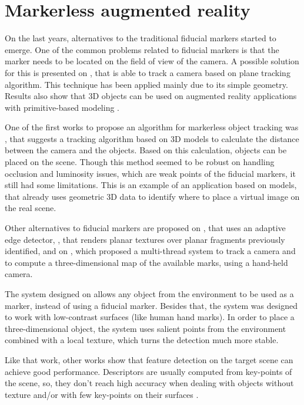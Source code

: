 \documentclass[msc, a4paper, classic, en]{ufbathesis}
\begin{document}
\section{Markerless augmented reality}

On the last years, alternatives to the traditional fiducial markers started to emerge. One of the common problems related to fiducial markers is that the marker needs to be located on the field of view of the camera. A possible solution for this is presented on \cite{5739718}, that is able to track a camera based on plane tracking algorithm. This technique has been applied mainly due to its simple geometry. Results also show that 3D objects can be used on augmented reality applications with primitive-based modeling \cite{KimLW10}.

One of the first works to propose an algorithm for markerless object tracking was \cite{Comport03d}, that suggests a tracking algorithm based on 3D models to calculate the distance between the camera and the objects. Based on this calculation, objects can be placed on the scene. Though this method seemed to be robust on handling occlusion and luminosity issues, which are weak points of the fiducial markers, it still had some limitations. This is an example of an application based on models, that already uses geometric 3D data to identify where to place a virtual image on the real scene.

Other alternatives to fiducial markers are proposed on \cite{wuest}, that uses an adaptive edge detector, \cite{ferrari}, that renders planar textures over planar fragments previously identified, and on \cite{klein}, which proposed a multi-thread system to track a camera and to compute a three-dimensional map of the available marks, using a hand-held camera.

The system designed on \cite{ZhangL12} allows any object from the environment to be used as a marker, instead of using a fiducial marker. Besides that, the system was designed to work with low-contrast surfaces (like human hand marks). In order to place a three-dimensional object, the system uses salient points from the environment combined with a local texture, which turns the detection much more stable.

Like that work, other works show that feature detection on the target scene can achieve good performance. Descriptors are usually computed from key-points of the scene, so, they don't reach high accuracy when dealing with objects without texture and/or with few key-points on their surfaces \cite{bay}.
\end{document}
